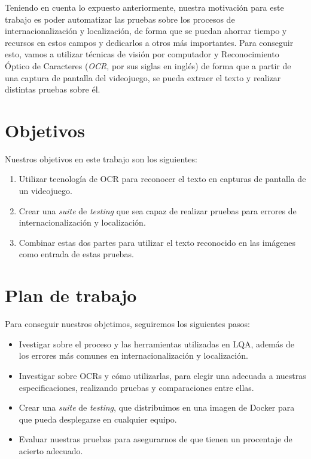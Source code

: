 Teniendo en cuenta lo expuesto anteriormente, nuestra motivación para este trabajo es poder automatizar las pruebas sobre los procesos de internacionalización y localización, de forma que se puedan ahorrar tiempo y recursos en estos campos y dedicarlos a otros más importantes. Para conseguir esto, vamos a utilizar técnicas de visión por computador y Reconocimiento Óptico de Caracteres (\textit{OCR}, por sus siglas en inglés) de forma que a partir de una captura de pantalla del videojuego, se pueda extraer el texto y realizar distintas pruebas sobre él.


\section{Objetivos}
Nuestros objetivos en este trabajo son los siguientes:
\begin{enumerate}
	\item Utilizar tecnología de OCR para reconocer el texto en capturas de pantalla de un videojuego.
	\item Crear una \textit{suite} de \textit{testing} que sea capaz de realizar pruebas para errores de internacionalización y localización.
	\item Combinar estas dos partes para utilizar el texto reconocido en las imágenes como entrada de estas pruebas.
\end{enumerate}


\section{Plan de trabajo}
Para conseguir nuestros objetimos, seguiremos los siguientes pasos:
\begin{itemize}
	\item Ivestigar sobre el proceso y las herramientas utilizadas en LQA, además de los errores más comunes en internacionalización y localización.
	\item Investigar sobre OCRs y cómo utilizarlas, para elegir una adecuada a nuestras especificaciones, realizando pruebas y comparaciones entre ellas.
	\item Crear una \textit{suite} de \textit{testing}, que distribuimos en una imagen de Docker para que pueda desplegarse en cualquier equipo.
	\item Evaluar nuestras pruebas para asegurarnos de que tienen un procentaje de acierto adecuado.
\end{itemize}




